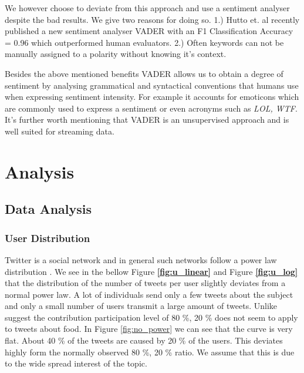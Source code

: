 We however choose to deviate from this approach and use a sentiment analyser despite the bad results. We give two reasons for doing so. 1.) Hutto et. al recently published a new sentiment analyser VADER \cite{hutton14} with an F1 Classification Accuracy = 0.96 which  outperformed human evaluators. 2.) Often keywords can not be manually assigned to a polarity without knowing it's context. 

Besides the above mentioned benefits VADER allows us to obtain a degree of sentiment by analysing grammatical and syntactical conventions that humans use when expressing sentiment intensity. For example it accounts for emoticons which are commonly used to express a sentiment or even acronyms such as \emph{LOL, WTF}. It's further worth mentioning that VADER is an unsupervised approach and is well suited for streaming data. 






\chapter{Analysis}






\section{Data Analysis}


\subsection {User Distribution}

Twitter is a social network and in general such networks follow a power law distribution \cite{Whittaker:1998}. We see in the bellow Figure \textbf{\ref{fig:u_linear}} and Figure \textbf{\ref{fig:u_log}}  that the distribution of the number of tweets per user slightly deviates from a normal power law. A lot of individuals  send only a few tweets about the subject and only a small number of users transmit a large amount of tweets. Unlike \cite{bild15} suggest the contribution participation level of  80 \%, 20 \%   does not seem to apply to tweets about food. In Figure \ref{fig:no_power} we can see that the curve is very flat. About 40 \% of the tweets are caused by 20 \% of the users. This deviates highly form the normally observed 80 \%, 20 \% ratio. We assume that this is due to the wide spread interest of the topic.

